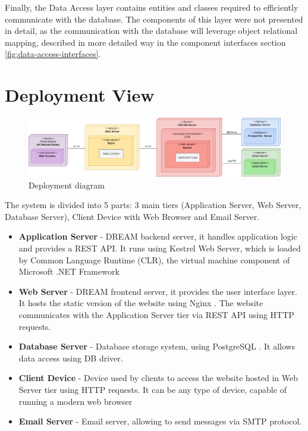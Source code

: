 Finally, the Data Access layer contains entities and classes required to efficiently communicate with the database. The components of this layer were not presented in detail, as the communication with the database will leverage object relational mapping, described in more detailed way in the component interfaces section \ref{fig:data-access-interfaces}.

\section{Deployment View}
\begin{figure}[H]
    \centering
    \includegraphics[width=\textwidth]{diagrams/deployment.png}
    \caption{Deployment diagram}
    \label{fig:deployment}
\end{figure}
The system is divided into 5 parts: 3 main tiers  (Application Server, Web Server, Database Server), Client Device with Web Browser and Email Server.
\begin{itemize}
    \item \textbf{Application Server} - DREAM backend server, it handles application logic and provides a REST API. It runs using Kestrel Web Server, which is loaded by Common Language Runtime (CLR), the virtual machine component of Microsoft .NET Framework 
    \item \textbf{Web Server} - DREAM frontend server, it provides the user interface layer. It hosts the static version of the website using Nginx \cite{nginx}. The website communicates with the Application Server tier via REST API using HTTP requests.
    \item \textbf{Database Server} - Database storage system, using PostgreSQL \cite{postgresql}. It allows data access using DB driver. 
    \item \textbf{Client Device} - Device used by clients to access the website hosted in Web Server tier using HTTP requests. It can be any type of device, capable of running a modern web browser
    \item \textbf{Email Server} - Email server, allowing to send messages via SMTP protocol.
\end{itemize}


